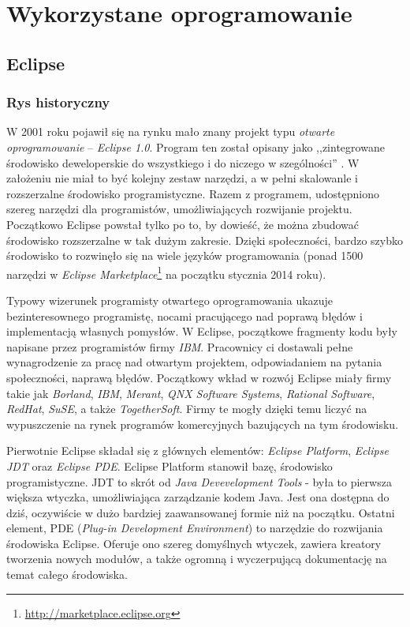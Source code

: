 \chapter{Wykorzystane oprogramowanie}
\label{czwarty}
\section{Eclipse}
\label{sec:eclipseśrodowisko}
\subsection{Rys historyczny}
W 2001 roku pojawił się na rynku mało znany projekt typu \emph{otwarte oprogramowanie} – \emph{Eclipse 1.0}. Program ten został opisany jako ,,zintegrowane środowisko deweloperskie do wszystkiego i do niczego w szególności'' \cite{eclipsearticle}. W założeniu nie miał to być kolejny zestaw narzędzi, a w pełni skalowanle i rozszerzalne środowisko programistyczne. Razem z programem, udostępniono szereg narzędzi dla programistów, umożliwiających rozwijanie projektu. Początkowo Eclipse powstał tylko po to, by dowieść, że można zbudować środowisko rozszerzalne w tak dużym zakresie. Dzięki społeczności, bardzo szybko środowisko to rozwinęło się na wiele języków programowania (ponad 1500 narzędzi w \emph{Eclipse Marketplace}\footnote{\url{http://marketplace.eclipse.org}} na początku stycznia 2014 roku).

Typowy wizerunek programisty otwartego oprogramowania ukazuje bezinteresownego programistę, nocami pracującego nad poprawą błędów i implementacją własnych pomysłów. W Eclipse, początkowe fragmenty kodu były napisane przez programistów firmy \emph{IBM}. Pracownicy ci dostawali pełne wynagrodzenie za pracę nad otwartym projektem, odpowiadaniem na pytania społeczności, naprawą błędów. Początkowy wkład w rozwój Eclipse miały firmy takie jak \emph{Borland}, \emph{IBM}, \emph{Merant}, \emph{QNX Software Systems}, \emph{Rational Software}, \emph{RedHat}, \emph{SuSE}, a także \emph{TogetherSoft}. Firmy te mogły dzięki temu liczyć na wypuszczenie na rynek programów komercyjnych bazujących na tym środowisku. 

Pierwotnie Eclipse składał się z głównych elementów: \emph{Eclipse Platform}, \emph{Eclipse JDT} oraz \emph{Eclipse PDE}. Eclipse Platform stanowił bazę, środowisko programistyczne. JDT to skrót od \emph{Java Devevelopment Tools} - była to pierwsza większa wtyczka, umożliwiająca zarządzanie kodem Java. Jest ona dostępna do dziś, oczywiście w dużo bardziej zaawansowanej formie niż na początku. Ostatni element, PDE (\emph{Plug-in Development Environment}) to narzędzie do rozwijania środowiska Eclipse. Oferuje ono szereg domyślnych wtyczek, zawiera kreatory tworzenia nowych modułów, a także ogromną i wyczerpującą dokumentację na temat całego środowiska.

